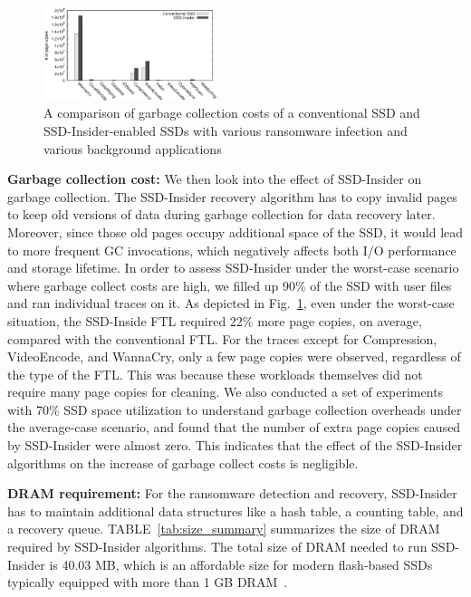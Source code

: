 \documentclass[conference]{IEEEtran}
\newcommand{\ours}{SSD-Insider}
\begin{document}
\begin{figure}[t] 
	\centering 
	\includegraphics[width=0.45\textwidth]{exp/gc-high/fig}
	\caption{A comparison of garbage collection costs of
	a conventional SSD and \ours{}-enabled SSDs with various ransomware infection and various background applications} 
	\label{fig:flash-gc-cost} 
\end{figure}

{\bf Garbage collection cost:}
We then look into the effect of \ours{} on garbage collection.  The
\ours{} recovery algorithm has to copy invalid pages to keep old
versions of data during garbage collection for data recovery later.
Moreover, since those old pages occupy additional space of the SSD,
it would lead to more frequent GC invocations, which negatively
affects both I/O performance and storage lifetime.  In order to
assess \ours{} under the worst-case scenario where garbage collect
costs are high, we filled up 90\% of the SSD with user files and
ran individual traces on it. As depicted in
Fig.~\ref{fig:flash-gc-cost}, even under the worst-case situation,
the SSD-Inside FTL required 22\% more page copies, on average,
compared with the conventional FTL. For the traces except for
Compression, VideoEncode, and WannaCry, only a few
page copies were observed, regardless of the type of the FTL. This
was because these workloads themselves did not require many page
copies for cleaning.  We also conducted a set of experiments with
70\% SSD  space utilization to understand garbage collection overheads
under the average-case scenario, and found that the number of extra
page copies caused by SSD-Insider were almost zero. This
indicates that the effect of the \ours{} algorithms on the increase
of garbage collect costs is negligible.

{\bf DRAM requirement:}
For the ransomware detection and recovery, \ours{} has to maintain additional
data structures like a hash table, a counting table, and a recovery queue.
TABLE~\ref{tab:size_summary} summarizes the size of DRAM required by \ours{}
algorithms. The total size of DRAM needed to run \ours{} is 40.03 MB, which is
an affordable size for modern flash-based SSDs typically equipped with more
than 1 GB DRAM~\cite{hitachi-ssd, samsung-ssd, phison-ssd}.
\end{document}
